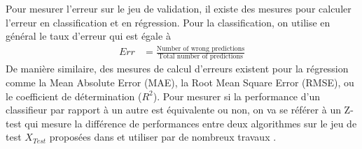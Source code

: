 Pour mesurer l'erreur sur le jeu de validation, il existe des mesures pour calculer l'erreur en classification et en régression. Pour la classification, on utilise en général le taux d'erreur qui est égale à
\begin{align}
Err & = \frac{\text{Number of wrong predictions}}{\text{Total number of predictions}}
\end{align}
De manière similaire, des mesures de calcul d'erreurs existent pour la régression  comme la Mean Absolute Error (MAE), la Root Mean Square Error (RMSE), ou le coefficient de détermination ($R^2$). Pour mesurer si la performance d'un classifieur par rapport à un autre est équivalente ou non, on va se référer à un Z-test qui mesure la différence de performances entre deux algorithmes sur le jeu de test $X_{Test}$ proposées dans \cite{Cochran1977} et utiliser par de nombreux travaux \cite{Dietterich1997,Dietterich1995}.


